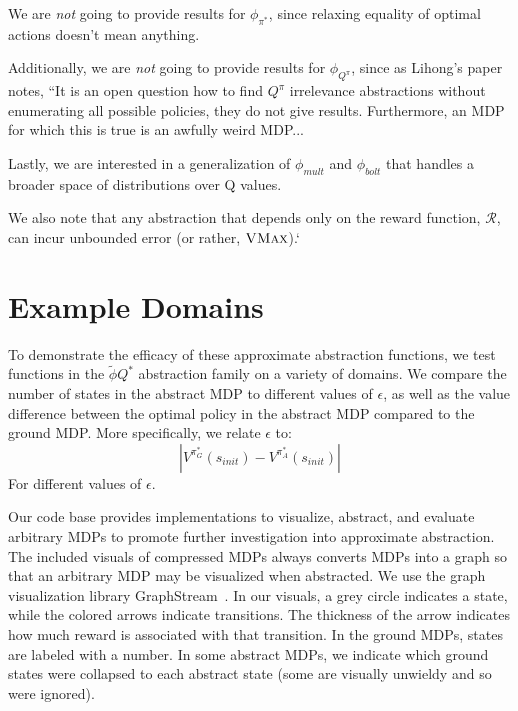 \documentclass{article}
\newcommand{\ep}{\widetilde \phi}
\begin{document}
We are {\it not} going to provide results for $\phi_{\pi^*}$, since relaxing equality of optimal actions doesn't mean anything.

Additionally, we are {\it not} going to provide results for $\phi_{Q^\pi}$, since as Lihong's paper notes, ``It is an open question how to find $Q^\pi$ irrelevance abstractions without enumerating all possible policies, they do not give results. Furthermore, an MDP for which this is true is an awfully weird MDP...

Lastly, we are interested in a generalization of $\phi_{mult}$  and $\phi_{bolt}$ that handles a broader space of distributions over Q values.

We also note that any abstraction that depends only on the reward function, $\mathcal{R}$, can incur unbounded error (or rather, $\textsc{VMax}$).`




\section{Example Domains}

To demonstrate the efficacy of these approximate abstraction functions, we test functions in the $\ep{Q^*}$ abstraction family on a variety of domains. We compare the number of states in the abstract MDP to different values of $\epsilon$, as well as the value difference between the optimal policy in the abstract MDP compared to the ground MDP. More specifically, we relate $\epsilon$ to:
\begin{equation}
|V^{\pi_G^*}(s_{init}) - V^{\pi_A^*}(s_{init})|
\end{equation}
For different values of $\epsilon$.

Our code base provides implementations to visualize, abstract, and evaluate arbitrary MDPs to promote further investigation into approximate abstraction. The included visuals of compressed MDPs always converts MDPs into a graph so that an arbitrary MDP may be visualized when abstracted. We use the graph visualization library GraphStream~\cite{graphstream}. In our visuals, a grey circle indicates a state, while the colored arrows indicate transitions. The thickness of the arrow indicates how much reward is associated with that transition. In the ground MDPs, states are labeled with a number. In some abstract MDPs, we indicate which ground states were collapsed to each abstract state (some are visually unwieldy and so were ignored).
\end{document}
